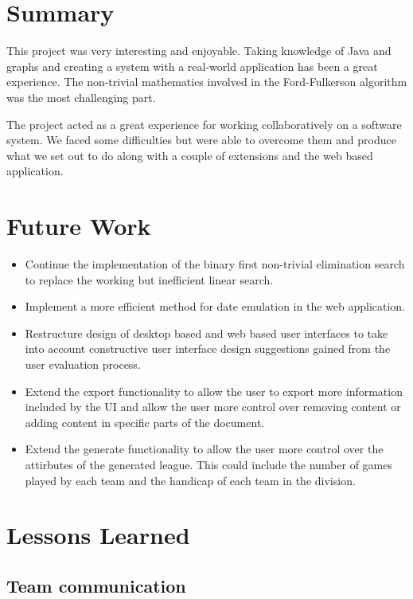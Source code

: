 \section{Summary}

This project was very interesting and enjoyable. Taking knowledge of Java
and graphs and creating a system with a real-world application has been a
great experience. The non-trivial mathematics involved in the Ford-Fulkerson
algorithm was the most challenging part.

The project acted as a great experience for working collaboratively on a
software system. We faced some difficulties but were able to overcome them and
produce what we set out to do along with a couple of extensions and the web
based application.

\section{Future Work}

\begin{itemize}
\item Continue the implementation of the binary first non-trivial elimination
search to replace the working but inefficient linear search.
\item Implement a more efficient method for date emulation in the web
application.
\item Restructure design of desktop based and web based user interfaces to
take into account constructive user interface design suggestions gained from
the user evaluation process.
\item Extend the export functionality to allow the user to export more
  information included by the UI and allow the user more control over
  removing content or adding content in specific parts of the
  document.
\item Extend the generate functionality to allow the user more control
  over the attirbutes of the generated league. This could include the
  number of games played by each team and the handicap of each team in
  the division.
\end{itemize}

\section{Lessons Learned}

\subsection{Team communication}

